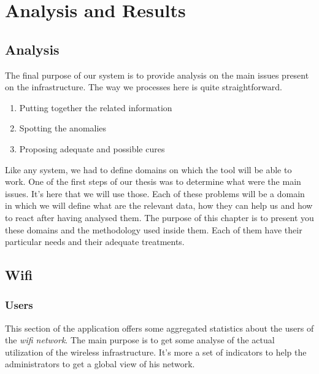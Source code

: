 
\chapter{Analysis and Results} %

\label{Chapter6} %


\section{Analysis}
The final purpose of our system is to provide analysis on the main issues present on the infrastructure. The way we processes here is quite straightforward.

\begin{enumerate}
\item Putting together the related information
\item Spotting the anomalies
\item Proposing adequate and possible cures
\end{enumerate}

Like any system, we had to define domains on which the tool will be able to work. One of the first steps of our thesis was to determine what were the main issues. It's here that we will use those. Each of these problems will be a domain in which we will define what are the relevant data, how they can help us and how to react after having analysed them. The purpose of this chapter is to present you these domains and the methodology used inside them. Each of them have their particular needs and their adequate treatments.

\section{Wifi}
\subsection{Users}
This section of the application offers some aggregated statistics about the users of the \emph{wifi network}. The main purpose is to get some analyse of the actual utilization of the wireless infrastructure. It's more a set of indicators to help the administrators to get a global view of his network. 
